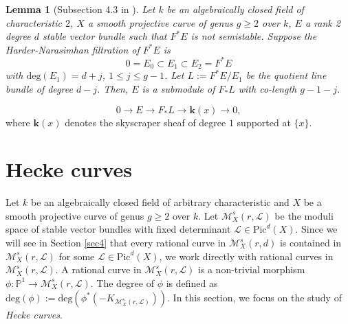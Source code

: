 \documentclass[10pt,a4paper]{amsart}
\newtheorem{lemma}{Lemma}
\begin{document}
\begin{lemma}[Subsection 4.3 in \cite{JRXY06}]\label{lemma4}
Let $k$ be an algebraically closed field of characteristic $2$, $X$ a smooth projective curve of genus $g\geqslant 2$ over $k$, $E$  a rank 2 degree $d$ stable vector bundle such that $F^*E$ is not semistable. Suppose the Harder-Narasimhan filtration of $F^*E$ is 
$$0= E_0\subset E_1 \subset E_2=F^*E$$
with $\mathrm{deg}(E_1)=d+j$, $1 \leqslant j \leqslant g-1$. Let $L:=F^*E/E_1$ be the quotient line bundle of degree $d-j$. Then, $E$ is a submodule of $F_*L$ with co-length $g-1-j$.
\end{lemma}

\begin{equation*}
    0 \to E \to F_*L \to \textbf{k}(x) \to 0,
\end{equation*}
where $\textbf{k}(x)$ denotes the skyscraper sheaf of degree $1$ supported at $\{x\}$.


\section{Hecke curves}\label{sec3}
Let $k$ be an algebraically closed field of arbitrary characteristic and $X$ be a smooth projective curve of genus $g \geqslant 2$  over $k$. Let $\mathcal{M}^s_X(r,\mathcal{L})$ be the moduli space of stable vector bundles with fixed determinant $\mathcal{L} \in \mathrm{Pic}^d(X)$. 
Since we will see in Section \ref{sec4} that every rational curve in $\mathcal{M}^s_X(r,d)$ is contained in $\mathcal{M}^s_X(r,\mathcal{L})$ for some $\mathcal{L}\in \mathrm{Pic}^d(X)$, we work directly with rational curves in $\mathcal{M}^s_X(r,\mathcal{L})$. A rational curve in $\mathcal{M}^s_X(r,\mathcal{L})$ is a non-trivial morphism $\phi:\mathbb{P}^1 \to \mathcal{M}^s_X(r,\mathcal{L})$. The degree of $\phi$ is defined as $\mathrm{deg}(\phi):=\mathrm{deg}(\phi^*(-K_{\mathcal{M}^s_X(r,\mathcal{L})}))$. In this section, we focus on the study of \emph{Hecke curves}. 
\end{document}
